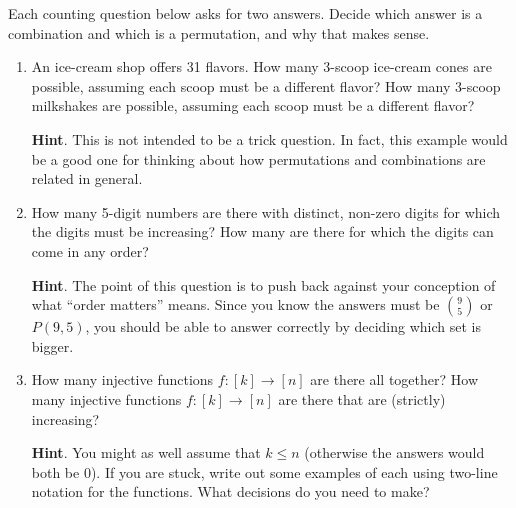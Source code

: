 \documentclass{book}
\begin{document}
\setcounter{cpjt}{116}
\addtocounter{cpjt}{-1}
\begin{activity}\label{activity-109}
\hypertarget{p-789}{}%
Each counting question below asks for two answers.  Decide which answer is a combination and which is a permutation, and why that makes sense.%
\begin{enumerate}[font=\bfseries,label=(\alph*),ref=\alph*]
\item\label{task-147} \hypertarget{p-790}{}%
An ice-cream shop offers 31 flavors.  How many 3-scoop ice-cream cones are possible, assuming each scoop must be a different flavor?  How many 3-scoop milkshakes are possible, assuming each scoop must be a different flavor?%
\par\smallskip%
\noindent\textbf{Hint}.\hypertarget{hint-73}{}\quad%
\hypertarget{p-791}{}%
This is not intended to be a trick question.  In fact, this example would be a good one for thinking about how permutations and combinations are related in general.%
\item\label{task-148} \hypertarget{p-792}{}%
How many 5-digit numbers are there with distinct, non-zero digits for which the digits must be increasing?  How many are there for which the digits can come in any order?%
\par\smallskip%
\noindent\textbf{Hint}.\hypertarget{hint-74}{}\quad%
\hypertarget{p-793}{}%
The point of this question is to push back against your conception of what ``order matters'' means.  Since you know the answers must be \(\binom{9}{5}\) or \(P(9,5)\), you should be able to answer correctly by deciding which set is bigger.%
\item\label{task-149} \hypertarget{p-794}{}%
How many injective functions \(f:[k] \to [n]\) are there all   together?  How many injective functions \(f:[k] \to [n]\) are there that are (strictly) increasing?%
\par\smallskip%
\noindent\textbf{Hint}.\hypertarget{hint-75}{}\quad%
\hypertarget{p-795}{}%
You might as well assume that \(k \le n\) (otherwise the answers would both be 0).  If you are stuck, write out some examples of each using two-line notation for the functions.  What decisions do you need to make?%
\end{enumerate}
\end{activity}

\clearpage
\end{document}

